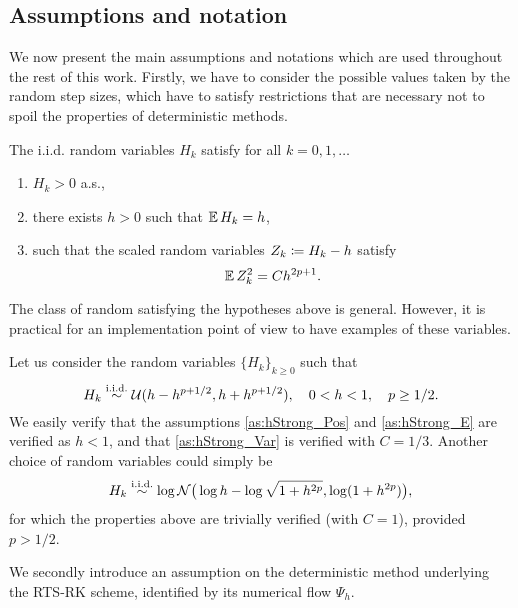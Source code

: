\documentclass[10pt]{article}
\begin{document}
\subsection{Assumptions and notation} We now present the main assumptions and notations which are used throughout the rest of this work. Firstly, we have to consider the possible values taken by the random step sizes, which have to satisfy restrictions that are necessary not to spoil the properties of deterministic methods. 
\begin{assumption}\label{as:hStrong} The i.i.d. random variables $H_k$ satisfy for all $k = 0, 1, \ldots$
	\begin{enumerate}
		\item\label{as:hStrong_Pos} $H_k > 0$ a.s.,
		\item\label{as:hStrong_E} there exists $h > 0$ such that $\operatorname{\mathbb{E}} H_k = h$,
		\item\label{as:hStrong_Var}  such that the scaled random variables $Z_k \coloneqq H_k - h$ satisfy
		\begin{equation}
			\operatorname{\mathbb{E}} Z_k^2 = Ch^{2p+1}.
		\end{equation}
	\end{enumerate}
\end{assumption}
The class of random  satisfying the hypotheses above is general. However, it is practical for an implementation point of view to have examples of these variables.
\begin{example}\label{ex:uniformH} Let us consider the random variables $\{H_k\}_{k\geq 0}$ such that
	\begin{equation}
	H_k \stackrel{\text{i.i.d.}}{\sim} \mathcal{U}(h-h^{p+1/2}, h+h^{p+1/2}), \quad 0 < h < 1, \quad p \geq 1/2.
	\end{equation}
	We easily verify that the assumptions \ref{as:hStrong_Pos} and \ref{as:hStrong_E} are verified as $h < 1$, and that \ref{as:hStrong_Var} is verified with $C = 1/3$. Another choice of random variables could simply be 
	\begin{equation}\label{eq:logNormalH}
	H_k \stackrel{\text{i.i.d.}}{\sim} \log\mathcal{N}\big(\log h - \log\sqrt{1 + h^{2p}}, \log(1 + h^{2p})\big),
	\end{equation}
	for which the properties above are trivially verified (with $C = 1$), provided $p > 1/2$.
\end{example}
We secondly introduce an assumption on the deterministic  method underlying the RTS-RK scheme, identified by its numerical flow $\Psi_h$. 
\end{document}
